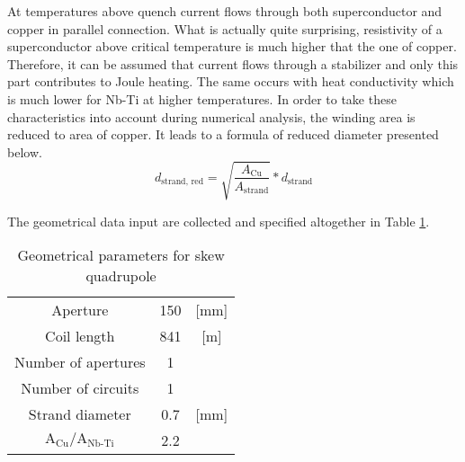 At temperatures above quench current flows through both superconductor and copper in parallel connection. What is actually quite surprising, resistivity of a superconductor above critical temperature is much higher that the one of copper. Therefore, it can be assumed that current flows through a stabilizer and only this part contributes to Joule heating. The same occurs with heat conductivity which is much lower for Nb-Ti at higher temperatures. In order to take these characteristics into account during numerical analysis, the winding area is reduced to area of copper. It leads to a formula of reduced diameter presented below.
\begin{equation}
    d_\text{strand, red} = \sqrt{\frac{A_\text{Cu}}{A_\text{strand}}}*d_\text{strand}
\end{equation}

 

The geometrical data input are collected and specified altogether in Table \ref{table:skew_quad_params_table}.

\begin{table}[h!]
    \caption{Geometrical parameters for skew quadrupole \cite{hl_lhc_tech_design_report_v01, marco_prioli_mails}} 
    \vspace{-1.em} 
    \fontsize{10}{10}
    \selectfont 
    \renewcommand{\arraystretch}{1.5}
    \begin{center}
    \begin{tabular}{ ccc }  
    \hline
    Aperture & 150 & [mm]\\
    Coil length & 841 & [m] \\
    Number of apertures & 1 & \\
    Number of circuits & 1 & \\
    Strand diameter & 0.7 & [mm] \\
    $\text{A}_\text{Cu}/\text{A}_\text{Nb-Ti}$ \cite{marco_prioli_mails} & 2.2 & \\
    \hline 
    \end{tabular}
    \end{center}  
     \label{table:skew_quad_params_table} 
 \end{table}

